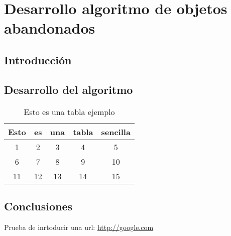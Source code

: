 
\chapter{Desarrollo algoritmo de objetos abandonados}
\label{cha:desarrollo}

\section{Introducción}
\label{sec:intro-alg-abandono}

\section{Desarrollo del algoritmo}
\label{sec:alg-abandono}


\begin{table}[!h]
\centering
\begin{tabular}{|c|c|c|c|c|}
\hline
Esto & es & una & tabla & sencilla \\ \hline
1    & 2  & 3   & 4     & 5        \\ \hline
6    & 7  & 8   & 9     & 10       \\ \hline
11   & 12 & 13  & 14    & 15       \\ \hline
\end{tabular}
\caption{Esto es una tabla ejemplo}
\label{tab:my-table}
\end{table}

\section{Conclusiones}
\label{sec:conclu-alg-abandono}

Prueba de inrtoducir una url: \url{http://google.com}